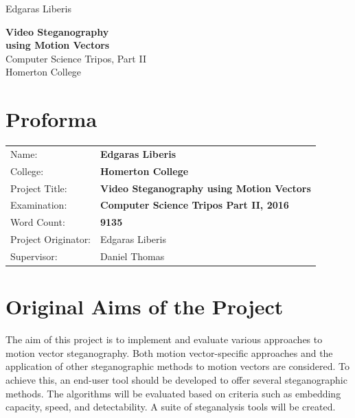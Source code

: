 \documentclass[12pt,british,twoside,notitlepage,usenames,dvipsnames,hypens,final]{report}
\numberwithin{equation}{section}
\numberwithin{figure}{section}
\begin{document}
\pagestyle{empty}

\hfill{\LARGE Edgaras Liberis}

\vspace*{60mm}
\begin{center}
\Huge
{\bf Video Steganography \\ using Motion Vectors} \\
\vspace*{10mm}
{ \sc \LARGE
Computer Science Tripos, Part II \\
Homerton College \\
}
\vspace*{10mm}
\the\year 
\end{center}

\cleardoublepage

\setcounter{page}{3}
\pagestyle{plain}

{\section*{\Huge Proforma}}

{\large
\begin{tabular}{ll}
Name:               & \bf Edgaras Liberis                          \\
College:            & \bf Homerton College                         \\
Project Title:      & \bf Video Steganography using Motion Vectors \\
Examination:        & \bf Computer Science Tripos Part II, 2016    \\
Word Count:         & \bf 9135\footnotemark[1]                     \\
Project Originator: & Edgaras Liberis                              \\
Supervisor:         & Daniel Thomas                                \\ 
\end{tabular}
}
\vspace{0.5cm}

\section*{Original Aims of the Project}

The aim of this project is to implement and evaluate various approaches to motion vector steganography. Both motion vector-specific approaches and the application of other steganographic methods to motion vectors are considered. To achieve this, an end-user tool should be developed to offer several steganographic methods. The algorithms will be evaluated based on criteria such as embedding capacity, speed, and detectability. A suite of steganalysis tools will be created.  
\end{document}
